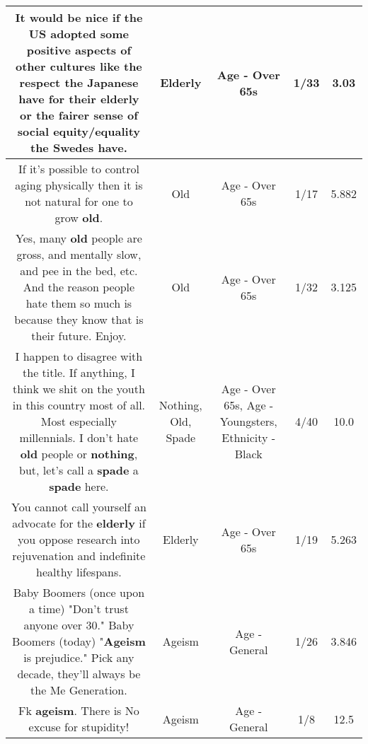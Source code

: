 \documentclass[11pt]{article}
\newlength\mylength
\begin{document}
\begin{center}
\begin{longtable}{|C{.65\mylength}|C{.30\mylength}|C{.12\mylength}|C{.12\mylength}|C{.12\mylength}|}
  \small It would be nice if the US adopted some positive aspects of other cultures like the respect the Japanese have for their \textbf{elderly} or the fairer sense of social equity/equality the Swedes have.\normalsize   & Elderly & Age - Over 65s & 1/33 & 3.03 \\  \hline
  \small If it's possible to control aging physically then it is not natural for one to grow \textbf{old}.\normalsize   & Old & Age - Over 65s & 1/17 & 5.882 \\  \hline
  \small Yes, many \textbf{old} people are gross, and mentally slow, and pee in the bed, etc. And the reason people hate them so much is because they know that is their future. Enjoy.\normalsize   & Old & Age - Over 65s & 1/32 & 3.125 \\  \hline
  \small I happen to disagree with the title. If anything, I think we shit on the youth in this country most of all. Most especially millennials.  I don't hate \textbf{old} people or \textbf{nothing}, but, let's call a \textbf{spade} a \textbf{spade} here.\normalsize   & Nothing, Old, Spade & Age - Over 65s, Age - Youngsters, Ethnicity - Black & 4/40 & 10.0 \\  \hline
  \small You cannot call yourself an advocate for the \textbf{elderly} if you oppose research into rejuvenation and indefinite healthy lifespans.\normalsize   & Elderly & Age - Over 65s & 1/19 & 5.263 \\  \hline
  \small Baby Boomers (once upon a time) "Don't trust anyone over 30." Baby Boomers (today) "\textbf{Ageism} is prejudice." Pick any decade, they'll always be the Me Generation.\normalsize   & Ageism & Age - General & 1/26 & 3.846 \\  \hline
  \small Fk \textbf{ageism}. There is No excuse for stupidity!\normalsize   & Ageism & Age - General & 1/8 & 12.5 \\  \hline

\end{longtable}
\end{center}
\end{document}

